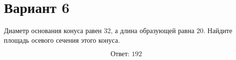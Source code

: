 \documentclass[12pt,a4paper]{article}
\begin{document}
\section*{Вариант 6}

Диаметр основания конуса равен 32, а длина образующей равна 20. Найдите площадь осевого сечения этого конуса.

\begin{center}
\end{center}

\[
\boxed{\text{Ответ: }192}
\]
\end{document}
